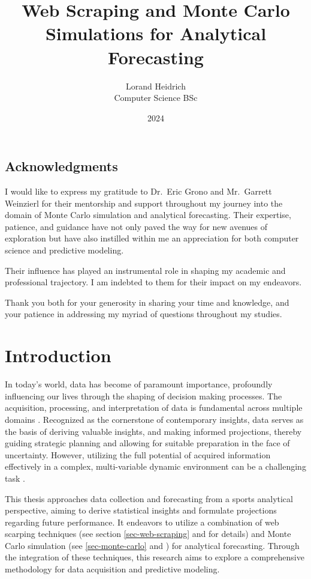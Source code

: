 \documentclass{thesis-ekf}
\institute{Institute of Mathematics and Informatics}
\title{Web Scraping and Monte Carlo Simulations for Analytical Forecasting}
\author{Lorand Heidrich\\ Computer Science BSc}
\date{2024}
\theoremstyle{definition}
\theoremstyle{remark}
\begin{document}
\maketitle


\clearpage
\section*{Acknowledgments}
\thispagestyle{empty} 
I would like to express my gratitude to Dr.~Eric Grono and Mr.~Garrett Weinzierl for their mentorship and support throughout my journey into the domain of Monte Carlo simulation and analytical forecasting. Their expertise, patience, and guidance have not only paved the way for new avenues of exploration but have also instilled within me an appreciation for both computer science and predictive modeling.

Their influence has played an instrumental role in shaping my academic and professional trajectory. I am indebted to them for their impact on my endeavors.

Thank you both for your generosity in sharing your time and knowledge, and your patience in addressing my myriad of questions throughout my studies. 


\tableofcontents


\chapter{Introduction}
In today’s world, data has become of paramount importance, profoundly influencing our lives through the shaping of decision making processes. The acquisition, processing, and interpretation of data is fundamental across multiple domains \cite{Mondaut}. Recognized as the cornerstone of contemporary insights, data serves as the basis of deriving valuable insights, and making informed projections, thereby guiding strategic planning and allowing for suitable preparation in the face of uncertainty. However, utilizing the full potential of acquired information effectively in a complex, multi-variable dynamic environment can be a challenging task \cite{Kornwitz}.

This thesis approaches data collection and forecasting from a sports analytical perspective, aiming to derive statistical insights and formulate projections regarding future performance. It endeavors to utilize a combination of web scarping techniques (see section \ref{sec-web-scraping} and \cite{Khder} for details) and Monte Carlo simulation (see \ref{sec-monte-carlo} and \cite{Aderibigbe}) for analytical forecasting. Through the integration of these techniques, this research aims to explore a comprehensive methodology for data acquisition and predictive modeling.
\end{document}
